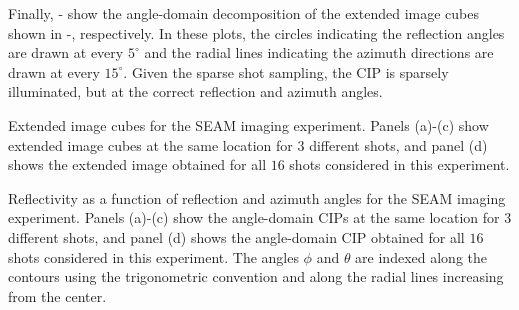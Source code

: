 Finally, - show the angle-domain
decomposition of the extended image cubes shown in
-, respectively. In these plots, the
circles indicating the reflection angles are drawn at every $5^\circ$
and the radial lines indicating the azimuth directions are drawn at
every $15^\circ$. Given the sparse shot sampling, the CIP is sparsely
illuminated, but at the correct reflection and azimuth angles.

{Extended image cubes for the SEAM imaging experiment. Panels (a)-(c)
  show extended image cubes at the same location for $3$ different
  shots, and panel (d) shows the extended image obtained for all $16$
  shots considered in this experiment.}

{Reflectivity as a function of reflection and azimuth angles for the
  SEAM imaging experiment. Panels (a)-(c) show the angle-domain CIPs
  at the same location for $3$ different shots, and panel (d) shows
  the angle-domain CIP obtained for all $16$ shots considered in this
  experiment.  The angles $\phi$ and $\theta$ are indexed along the
  contours using the trigonometric convention and along the radial
  lines increasing from the center.}
